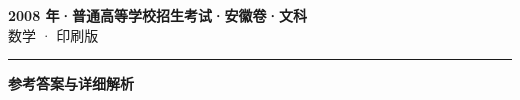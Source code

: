 \documentclass[zihao=5, a4paper]{ctexart}
\begin{document}
\begin{center}
  {\Large\bfseries 2008 年·普通高等学校招生考试·安徽卷·文科}\\[4pt]
  {\large 数学 · 印刷版}
\end{center}
\medskip
{}

\par\bigskip\hrule\bigskip
{}
\begin{center}{\large\bfseries 参考答案与详细解析}\end{center}
\smallskip

\end{document}
